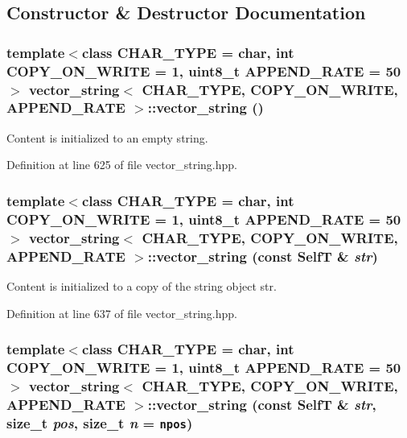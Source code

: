 \subsection{Constructor \& Destructor Documentation}
\hypertarget{classvector__string_074fd3f1b50a4daea063d45f9d30d32a}{
\subsubsection[{vector\_\-string}]{\setlength{\rightskip}{0pt plus 5cm}template$<$class CHAR\_\-TYPE  = char, int COPY\_\-ON\_\-WRITE = 1, uint8\_\-t APPEND\_\-RATE = 50$>$ {\bf vector\_\-string}$<$ CHAR\_\-TYPE, COPY\_\-ON\_\-WRITE, APPEND\_\-RATE $>$::{\bf vector\_\-string} ()}}
\label{classvector__string_074fd3f1b50a4daea063d45f9d30d32a}


Content is initialized to an empty string. 

Definition at line 625 of file vector\_\-string.hpp.\hypertarget{classvector__string_0965d3e8de0658ee5223187ce1d7ff48}{
\subsubsection[{vector\_\-string}]{\setlength{\rightskip}{0pt plus 5cm}template$<$class CHAR\_\-TYPE  = char, int COPY\_\-ON\_\-WRITE = 1, uint8\_\-t APPEND\_\-RATE = 50$>$ {\bf vector\_\-string}$<$ CHAR\_\-TYPE, COPY\_\-ON\_\-WRITE, APPEND\_\-RATE $>$::{\bf vector\_\-string} (const {\bf SelfT} \& {\em str})}}
\label{classvector__string_0965d3e8de0658ee5223187ce1d7ff48}


Content is initialized to a copy of the string object str. 

Definition at line 637 of file vector\_\-string.hpp.\hypertarget{classvector__string_14f2042cf130292b381a8073fc804ccc}{
\subsubsection[{vector\_\-string}]{\setlength{\rightskip}{0pt plus 5cm}template$<$class CHAR\_\-TYPE  = char, int COPY\_\-ON\_\-WRITE = 1, uint8\_\-t APPEND\_\-RATE = 50$>$ {\bf vector\_\-string}$<$ CHAR\_\-TYPE, COPY\_\-ON\_\-WRITE, APPEND\_\-RATE $>$::{\bf vector\_\-string} (const {\bf SelfT} \& {\em str}, \/  size\_\-t {\em pos}, \/  size\_\-t {\em n} = {\tt {\bf npos}})}}
\label{classvector__string_14f2042cf130292b381a8073fc804ccc}


